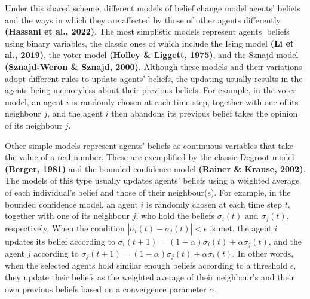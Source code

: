 \documentclass[
  11pt,
]{article}
\begin{document}
Under this shared scheme, different models of belief change model
agents' beliefs and the ways in which they are affected by those of
other agents differently \textbf{(Hassani et al., 2022)}. The most
simplistic models represent agents' beliefs using binary variables, the
classic ones of which include the Ising model \textbf{(Li et al.,
2019)}, the voter model \textbf{(Holley \& Liggett, 1975)}, and the
Sznajd model \textbf{(Sznajd-Weron \& Sznajd, 2000)}. Although these
models and their variations adopt different rules to update agents'
beliefs, the updating usually results in the agents being memoryless
about their previous beliefs. For example, in the voter model, an agent
\(i\) is randomly chosen at each time step, together with one of its
neighbour \(j\), and the agent \(i\) then abandons its previous belief
takes the opinion of its neighbour \(j\).

Other simple models represent agents' beliefs as continuous variables
that take the value of a real number. These are exemplified by the
classic Degroot model \textbf{(Berger, 1981)} and the bounded confidence
model \textbf{(Rainer \& Krause, 2002)}. The models of this type usually
updates agents' beliefs using a weighted average of each individual's
belief and those of their neighbour(s). For example, in the bounded
confidence model, an agent \(i\) is randomly chosen at each time step
\(t\), together with one of its neighbour \(j\), who hold the beliefs
\(\sigma_i(t)\) and \(\sigma_j(t)\), respectively. When the condition
\(|\sigma_i(t) - \sigma_j(t)| < \epsilon\) is met, the agent \(i\)
updates its belief according to
\(\sigma_i(t+1) = (1 - \alpha)\sigma_i(t) + \alpha\sigma_j(t)\), and the
agent \(j\) according to
\(\sigma_j(t+1) = (1 - \alpha)\sigma_j(t) + \alpha\sigma_i(t)\). In
other words, when the selected agents hold similar enough beliefs
according to a threshold \(\epsilon\), they update their beliefs as the
weighted average of their neighbour's and their own previous beliefs
based on a convergence parameter \(\alpha\).
\end{document}
